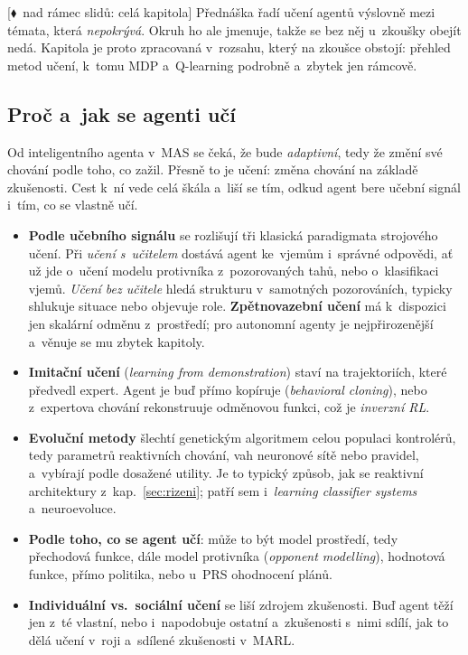 \documentclass[11pt,a4paper]{article}
\theoremstyle{definition}
\newcommand{\mimoq}[1]{\textcolor{markcol}{\textsf{\footnotesize[$\blacklozenge$~nad rámec slidů: #1]}}}
\begin{document}
\noindent\mimoq{celá kapitola} Přednáška řadí učení agentů výslovně mezi témata, která
\emph{nepokrývá}. Okruh ho ale jmenuje, takže se bez něj u~zkoušky obejít nedá. Kapitola je
proto zpracovaná v~rozsahu, který na zkoušce obstojí: přehled metod učení, k~tomu MDP
a~Q-learning podrobně a~zbytek jen rámcově.

\subsection{Proč a~jak se agenti učí}

Od inteligentního agenta v~MAS se čeká, že bude \emph{adaptivní}, tedy že změní své chování
podle toho, co zažil. Přesně to je učení: změna chování na základě zkušenosti. Cest k~ní vede
celá škála a~liší se tím, odkud agent bere učební signál i~tím, co se vlastně učí.

\begin{defbox}
\begin{itemize}
\item \textbf{Podle učebního signálu} se rozlišují tři klasická paradigmata strojového učení.
  Při \emph{učení s~učitelem} dostává agent ke~vjemům i~správné odpovědi, ať už jde o~učení
  modelu protivníka z~pozorovaných tahů, nebo o~klasifikaci vjemů. \emph{Učení bez učitele}
  hledá strukturu v~samotných pozorováních, typicky shlukuje situace nebo objevuje role.
  \textbf{Zpětnovazební učení} má k~dispozici jen skalární odměnu z~prostředí; pro autonomní
  agenty je nejpřirozenější a~věnuje se mu zbytek kapitoly.
\item \textbf{Imitační učení} (\emph{learning from demonstration}) staví na trajektoriích,
  které předvedl expert. Agent je buď přímo kopíruje (\emph{behavioral cloning}), nebo
  z~expertova chování rekonstruuje odměnovou funkci, což je \emph{inverzní RL}.
\item \textbf{Evoluční metody} šlechtí genetickým algoritmem celou populaci kontrolérů, tedy
  parametrů reaktivních chování, vah neuronové sítě nebo pravidel, a~vybírají podle dosažené
  utility. Je to typický způsob, jak se  reaktivní architektury
  z~kap.~\ref{sec:rizeni}; patří sem i~\emph{learning classifier systems} a~neuroevoluce.
\item \textbf{Podle toho, co se agent učí}: může to být model prostředí, tedy přechodová funkce,
  dále model protivníka (\emph{opponent modelling}), hodnotová funkce, přímo politika,
  nebo u~PRS ohodnocení plánů.
\item \textbf{Individuální vs.\ sociální učení} se liší zdrojem zkušenosti. Buď agent těží jen
  z~té vlastní, nebo i~napodobuje ostatní a~zkušenosti s~nimi sdílí, jak to dělá učení v~roji
  a~sdílené zkušenosti v~MARL.
\end{itemize}
\end{defbox}
\end{document}

